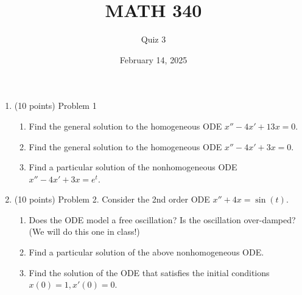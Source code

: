 \documentclass{article}
\begin{document}
\title{MATH 340}
\author{Quiz 3}
\date{February 14, 2025}
\maketitle

\begin{enumerate}
	\item (10 points) Problem 1
		\begin{enumerate}
			\item Find the general solution to the homogeneous ODE $x''-4x'+13x=0$.
			\item Find the general solution to the homogeneous ODE $x''-4x'+3x=0$.
			\item Find a particular solution of the nonhomogeneous ODE $x''-4x'+3x=e^t$.
		\end{enumerate}
	\item (10 points) Problem 2. Consider the 2nd order ODE $x''+4x=\sin(t)$.
		\begin{enumerate}
			\item Does the ODE model a free oscillation? Is the oscillation over-damped? (We will do this one in class!)
			\item Find a particular solution of the above nonhomogeneous ODE.
			\item Find the solution of the ODE that satisfies the initial conditions $x(0)=1,x'(0)=0$.
		\end{enumerate}
\end{enumerate}
\end{document}
